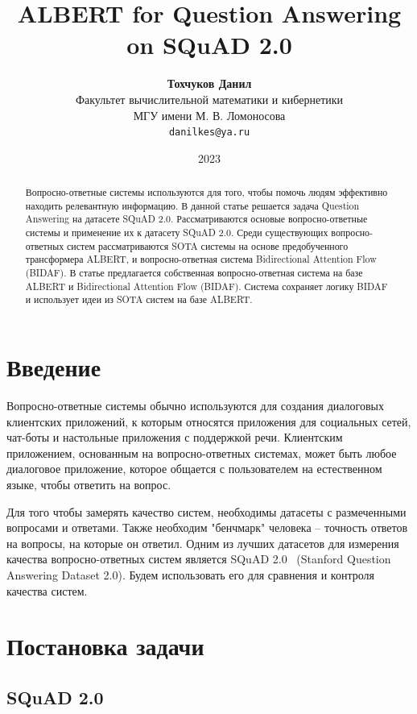 \documentclass{article}
\title{ALBERT for Question Answering on SQuAD 2.0}
\author{ 
	\textbf{Тохчуков Данил} \\
        Факультет вычислительной математики и кибернетики \\
        МГУ имени М. В. Ломоносова \\
	\texttt{danilkes@ya.ru} \\
}
\date{2023}
\begin{document}
\maketitle

\begin{abstract}
    Вопросно-ответные системы используются для того, чтобы помочь людям эффективно находить релевантную информацию.
    В данной статье решается задача Question Answering на датасете SQuAD 2.0. Рассматриваются основые вопросно-ответные системы и применение их к датасету SQuAD 2.0. Среди существующих вопросно-ответных систем рассматриваются SOTA системы на основе предобученного трансформера ALBERT, и вопросно-ответная система Bidirectional Attention Flow (BIDAF). В статье предлагается собственная вопросно-ответная система на базе ALBERT и Bidirectional Attention Flow (BIDAF). Система сохраняет логику BIDAF и использует идеи из SOTA систем на базе ALBERT.
\end{abstract}

\nocite{*}

\section{Введение}

Вопросно-ответные системы обычно используются для создания диалоговых клиентских приложений, 
к которым относятся приложения для социальных сетей, чат-боты и настольные приложения 
с поддержкой речи. Клиентским приложением, основанным на вопросно-ответных системах, может быть любое 
диалоговое приложение, которое общается с пользователем на естественном языке, чтобы ответить на 
вопрос.

Для того чтобы замерять качество систем, необходимы датасеты с размеченными вопросами и 
ответами. Также необходим "бенчмарк" человека -- точность ответов на вопросы, на которые он ответил.
Одним из лучших датасетов для измерения качества вопросно-ответных систем является 
SQuAD 2.0~\cite{SquadPaper} (Stanford Question Answering Dataset 2.0). 
Будем использовать его для сравнения и контроля качества систем.

\section{Постановка задачи}

\subsection{SQuAD 2.0}
\end{document}
